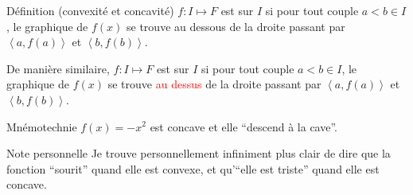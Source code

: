 \documentclass[a4paper]{article}
\begin{document}
\begin{parag}{Définition (convexité et concavité)}
    $f : I \mapsto F$ est  sur $I$ si pour tout couple $a < b \in I$, le graphique de $f\left(x\right)$ se trouve au dessous de la droite passant par $\left<a, f\left(a\right)\right>$ et $\left<b, f\left(b\right)\right>$.

    De manière similaire, $f : I \mapsto F$ est  sur $I$ si pour tout couple $a < b \in I$, le graphique de $f\left(x\right)$ se trouve \textcolor{red}{au dessus} de la droite passant par $\left<a, f\left(a\right)\right>$ et $\left<b, f\left(b\right)\right>$.


    \begin{subparag}{Mnémotechnie}
        $f\left(x\right) = -x^2$ est concave et elle ``descend à la cave''.
    \end{subparag}

    \begin{subparag}{Note personnelle}
        Je trouve personnellement infiniment plus clair de dire que la fonction ``sourit'' quand elle est convexe, et qu'``elle est triste'' quand elle est concave.
    \end{subparag}
\end{parag}
\end{document}
